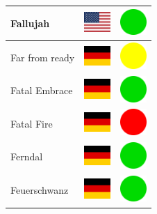\documentclass[12pt, a4paper, twoside]{report}
\begin{document}
\begin{center}
\begin{longtable}{|p{5cm}|p{2cm}|p{2cm}|}
 Fallujah                                                   & \includegraphics[width=1cm]{../img/flags/us} &   \includegraphics[width=1cm]{../likes/y} \\ \hline
 Far from ready                                             & \includegraphics[width=1cm]{../img/flags/de} &   \includegraphics[width=1cm]{../likes/m} \\ \hline
 Fatal Embrace                                              & \includegraphics[width=1cm]{../img/flags/de} &   \includegraphics[width=1cm]{../likes/y} \\ \hline
 Fatal Fire                                                 & \includegraphics[width=1cm]{../img/flags/de} &   \includegraphics[width=1cm]{../likes/n} \\ \hline
 Ferndal                                                    & \includegraphics[width=1cm]{../img/flags/de} &   \includegraphics[width=1cm]{../likes/y} \\ \hline
 Feuerschwanz                                               & \includegraphics[width=1cm]{../img/flags/de} &   \includegraphics[width=1cm]{../likes/y} \\ \hline

\end{longtable}
\end{center}
\end{document}

